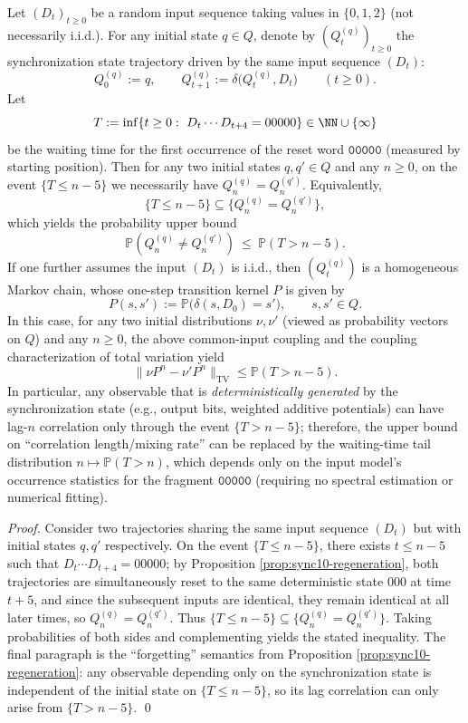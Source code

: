 \begin{corollary}\label{cor:sync10-regeneration-correlation-bound}
Let \((D_t)_{t\ge 0}\) be a random input sequence taking values in \(\{0,1,2\}\) (not necessarily i.i.d.).
For any initial state \(q\in Q\), denote by \((Q^{(q)}_t)_{t\ge 0}\) the synchronization state trajectory driven by the same input sequence \((D_t)\):
\[
Q^{(q)}_0:=q,\qquad Q^{(q)}_{t+1}:=\delta\!\bigl(Q^{(q)}_t,D_t\bigr)\qquad(t\ge 0).
\]
Let
\[
T:=\inf\{t\ge 0:\ D_t\cdots D_{t+4}=00000\}\in\NN\cup\{\infty\}
\]
be the waiting time for the first occurrence of the reset word \(\texttt{00000}\) (measured by starting position).
Then for any two initial states \(q,q'\in Q\) and any \(n\ge 0\), on the event \(\{T\le n-5\}\) we necessarily have \(Q^{(q)}_n=Q^{(q')}_n\).
Equivalently,
\[
\{T\le n-5\}\subseteq \{Q^{(q)}_n=Q^{(q')}_n\},
\]
which yields the probability upper bound
\[
\mathbb{P}\!\left(Q^{(q)}_n\neq Q^{(q')}_n\right)\ \le\ \mathbb{P}(T>n-5).
\]
If one further assumes the input \((D_t)\) is i.i.d., then \((Q^{(q)}_t)\) is a homogeneous Markov chain, whose one-step transition kernel \(P\) is given by
\[
P(s,s'):=\mathbb{P}\bigl(\delta(s,D_0)=s'\bigr),\qquad s,s'\in Q.
\]
In this case, for any two initial distributions \(\nu,\nu'\) (viewed as probability vectors on \(Q\)) and any \(n\ge 0\), the above common-input coupling and the coupling characterization of total variation yield
\[
\bigl\|\nu P^{n}-\nu'P^{n}\bigr\|_{\mathrm{TV}}\le \mathbb{P}(T>n-5).
\]
In particular, any observable that is \emph{deterministically generated} by the synchronization state (e.g., output bits, weighted additive potentials) can have lag-\(n\) correlation only through the event \(\{T>n-5\}\);
therefore, the upper bound on ``correlation length/mixing rate'' can be replaced by the waiting-time tail distribution \(n\mapsto \mathbb{P}(T>n)\), which depends only on the input model's occurrence statistics for the fragment \(\texttt{00000}\) (requiring no spectral estimation or numerical fitting).
\end{corollary}
\begin{proof}
Consider two trajectories sharing the same input sequence \((D_t)\) but with initial states \(q,q'\) respectively.
On the event \(\{T\le n-5\}\), there exists \(t\le n-5\) such that \(D_t\cdots D_{t+4}=00000\);
by Proposition \ref{prop:sync10-regeneration}, both trajectories are simultaneously reset to the same deterministic state \(000\) at time \(t+5\), and since the subsequent inputs are identical, they remain identical at all later times, so \(Q^{(q)}_n=Q^{(q')}_n\).
Thus \(\{T\le n-5\}\subseteq \{Q^{(q)}_n=Q^{(q')}_n\}\). Taking probabilities of both sides and complementing yields the stated inequality.
The final paragraph is the ``forgetting'' semantics from Proposition \ref{prop:sync10-regeneration}: any observable depending only on the synchronization state is independent of the initial state on \(\{T\le n-5\}\), so its lag correlation can only arise from \(\{T>n-5\}\).
\qed
\end{proof}

